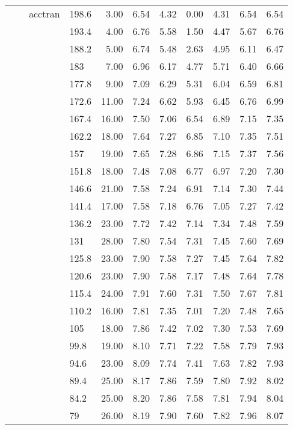 \begin{longtable}{llllrrrrrrr}
   &  & acctran & 198.6 & 3.00 & 6.54 & 4.32 & 0.00 & 4.31 & 6.54 & 6.54 \\ 
   &  &  & 193.4 & 4.00 & 6.76 & 5.58 & 1.50 & 4.47 & 5.67 & 6.76 \\ 
   &  &  & 188.2 & 5.00 & 6.74 & 5.48 & 2.63 & 4.95 & 6.11 & 6.47 \\ 
   &  &  & 183 & 7.00 & 6.96 & 6.17 & 4.77 & 5.71 & 6.40 & 6.66 \\ 
   &  &  & 177.8 & 9.00 & 7.09 & 6.29 & 5.31 & 6.04 & 6.59 & 6.81 \\ 
   &  &  & 172.6 & 11.00 & 7.24 & 6.62 & 5.93 & 6.45 & 6.76 & 6.99 \\ 
   &  &  & 167.4 & 16.00 & 7.50 & 7.06 & 6.54 & 6.89 & 7.15 & 7.35 \\ 
   &  &  & 162.2 & 18.00 & 7.64 & 7.27 & 6.85 & 7.10 & 7.35 & 7.51 \\ 
   &  &  & 157 & 19.00 & 7.65 & 7.28 & 6.86 & 7.15 & 7.37 & 7.56 \\ 
   &  &  & 151.8 & 18.00 & 7.48 & 7.08 & 6.77 & 6.97 & 7.20 & 7.30 \\ 
   &  &  & 146.6 & 21.00 & 7.58 & 7.24 & 6.91 & 7.14 & 7.30 & 7.44 \\ 
   &  &  & 141.4 & 17.00 & 7.58 & 7.18 & 6.76 & 7.05 & 7.27 & 7.42 \\ 
   &  &  & 136.2 & 23.00 & 7.72 & 7.42 & 7.14 & 7.34 & 7.48 & 7.59 \\ 
   &  &  & 131 & 28.00 & 7.80 & 7.54 & 7.31 & 7.45 & 7.60 & 7.69 \\ 
   &  &  & 125.8 & 23.00 & 7.90 & 7.58 & 7.27 & 7.45 & 7.64 & 7.82 \\ 
   &  &  & 120.6 & 23.00 & 7.90 & 7.58 & 7.17 & 7.48 & 7.64 & 7.78 \\ 
   &  &  & 115.4 & 24.00 & 7.91 & 7.60 & 7.31 & 7.50 & 7.67 & 7.81 \\ 
   &  &  & 110.2 & 16.00 & 7.81 & 7.35 & 7.01 & 7.20 & 7.48 & 7.65 \\ 
   &  &  & 105 & 18.00 & 7.86 & 7.42 & 7.02 & 7.30 & 7.53 & 7.69 \\ 
   &  &  & 99.8 & 19.00 & 8.10 & 7.71 & 7.22 & 7.58 & 7.79 & 7.93 \\ 
   &  &  & 94.6 & 23.00 & 8.09 & 7.74 & 7.41 & 7.63 & 7.82 & 7.93 \\ 
   &  &  & 89.4 & 25.00 & 8.17 & 7.86 & 7.59 & 7.80 & 7.92 & 8.02 \\ 
   &  &  & 84.2 & 25.00 & 8.20 & 7.86 & 7.58 & 7.81 & 7.94 & 8.04 \\ 
   &  &  & 79 & 26.00 & 8.19 & 7.90 & 7.60 & 7.82 & 7.96 & 8.07 \\ 

\end{longtable}
